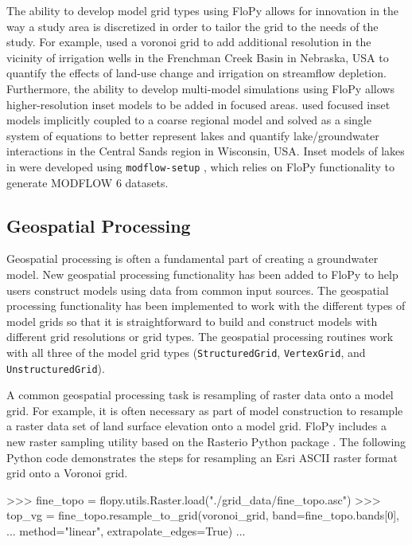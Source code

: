 \documentclass[11pt, oneside]{article}  	%
\begin{document}
The ability to develop model grid types using FloPy allows for innovation in the way a study area is discretized in order to tailor the grid to the needs of the study. For example, \cite{Moussa2018} used a voronoi grid to add additional resolution in the vicinity of irrigation wells in the Frenchman Creek Basin in Nebraska, USA to quantify the effects of land-use change and irrigation on streamflow depletion. Furthermore, the ability to develop multi-model simulations using FloPy allows higher-resolution inset models to be added in focused areas. \cite{fienen2022simulation} used focused inset models implicitly coupled to a coarse regional model and solved as a single system of equations to better represent lakes and quantify lake/groundwater interactions in the Central Sands region in Wisconsin, USA. Inset models of lakes in \cite{fienen2022simulation} were developed using \texttt{modflow-setup} \citep{leaf2022modflow}, which relies on FloPy functionality to generate MODFLOW 6 datasets.

\subsection{Geospatial Processing}

Geospatial processing is often a fundamental part of creating a groundwater model. New geospatial processing functionality has been added to FloPy to help users construct models using data from common input sources. The geospatial processing functionality has been implemented to work with the different types of model grids so that it is straightforward to build and construct models with different grid resolutions or grid types. The geospatial processing routines work with all three of the model grid types (\texttt{StructuredGrid}, \texttt{VertexGrid}, and \texttt{UnstructuredGrid}). 

A common geospatial processing task is resampling of raster data onto a model grid. For example, it is often necessary as part of model construction to resample a raster data set of land surface elevation onto a model grid. FloPy includes a new raster sampling utility based on the Rasterio Python package \citep{gillies_2019}. The following Python code demonstrates the steps for resampling an Esri ASCII raster format grid onto a Voronoi grid.

\begin{python}
>>> fine_topo = flopy.utils.Raster.load("./grid_data/fine_topo.asc")
>>> top_vg = fine_topo.resample_to_grid(voronoi_grid, band=fine_topo.bands[0],
... method="linear", extrapolate_edges=True)
...
\end{python}
\end{document}
